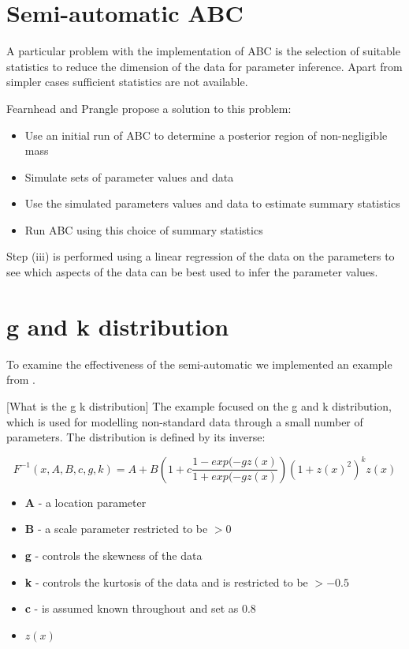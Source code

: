\documentclass{article} %
\begin{document}
\section{Semi-automatic ABC}
A particular problem with the implementation of ABC is the selection of suitable statistics to reduce the dimension of the data for parameter inference. Apart from simpler cases sufficient statistics are not available.

Fearnhead and Prangle \cite{Fearnhead} propose a solution to this problem:
\begin{itemize}
\item Use an initial run of ABC to determine a posterior region of non-negligible mass
\item Simulate sets of parameter values and data
\item Use the simulated parameters values and data to estimate summary statistics
\item Run ABC using this choice of summary statistics
\end{itemize}

Step (iii) is performed using a linear regression of the data on the parameters to see which aspects of the data can be best used to infer the parameter values.

\section{g and k distribution}
To examine the effectiveness of the semi-automatic we implemented an example from \cite{Fearnhead and Prangle}.

[What is the g k distribution]
The example focused on the g and k distribution, which is used for modelling non-standard data through a small number of parameters. The distribution is defined by its inverse:

\begin{equation}
F^{-1}(x, A, B, c, g, k) = A + B\left(1 + c\frac{1-exp(-gz(x)}{1+exp(-gz(x)}\right)(1+z(x)^2)^kz(x)
\end{equation}

\begin{itemize}
\item \textbf{A} - a location parameter
\item \textbf{B} - a scale parameter restricted to be $>0$
\item \textbf{g} - controls the skewness of the data
\item \textbf{k} - controls the kurtosis of the data and is restricted to be $> - 0.5$
\item \textbf{c} - is assumed known throughout and set as 0.8
\item \textbf{$z(x)$}
\end{itemize}
\end{document}
